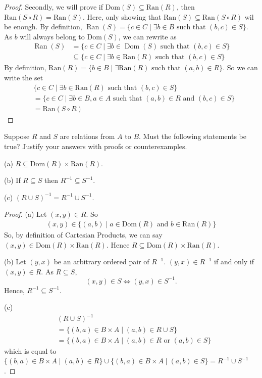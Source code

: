 \documentclass[12pt]{article}
\newenvironment{exercise}[2][Exercise]{\begin{trivlist}
\item[\hskip \labelsep {\bfseries #1}\hskip \labelsep {\bfseries #2.}]}{\end{trivlist}}
\newcommand{\ro}{\text { or }}
\newcommand{\nd}{\text{ and }}
\begin{document}
\begin{proof}
	Secondly, we will prove if $\text{Dom}(S)\subseteq \text{Ran}(R)$, then $\text{Ran}(S\circ R)=\text{Ran}(S)$. Here, only showing that $\text{Ran}(S)\subseteq \text{Ran}(S\circ R)$ wil be enough. By definition, $\operatorname{Ran}(S) = \{ c \in C \mid \exists b \in B \text{ such that } (b, c) \in S \}$. As $b$ will always belong to $\text{Dom}(S)$, we can rewrite as
\begin{align*}
	\operatorname{Ran}(S) &= \{ c \in C \mid \exists b \in \operatorname{Dom}(S) \text{ such that } (b, c) \in S \} \\
	& \subseteq \{c\in C\mid \exists b\in \text{Ran}(R) \text{ such that } (b,c)\in S\}
\end{align*}
By definition, $\text{Ran}(R)=\{b\in B\mid \exists \text{Ran}(R) \text{ such that } (a,b)\in R\}$. So we can write the set
\begin{align*}
	&\{c\in C\mid \exists b\in \text{Ran}(R) \text{ such that } (b,c)\in S\} \\
	&= \{c\in C\mid \exists b\in B, a\in A \text{ such that } (a,b)\in R \nd (b,c)\in S\} \\
	&= \text{Ran}(S\circ R)
\end{align*} 
\end{proof}

\begin{exercise}
	{10}
	Suppose \( R \) and \( S \) are relations from \( A \) to \( B \). Must the following statements be true? Justify your answers with proofs or counterexamples.

(a) \( R \subseteq \text{Dom}(R) \times \text{Ran}(R) \).

(b) If \( R \subseteq S \) then \( R^{-1} \subseteq S^{-1} \).

(c) \( (R \cup S)^{-1} = R^{-1} \cup S^{-1} \).
\end{exercise}

\begin{proof}
	(a) Let $(x,y)\in R$. So 
	\begin{align*}
		(x,y)\in \{(a,b)\mid a\in \text{Dom}(R) \nd b\in \text{Ran}(R)\}
	\end{align*}
	So, by definition of Cartesian Products, we can say $(x,y)\in \text{Dom}(R)\times \text{Ran}(R)$. Hence $R\subseteq \text{Dom}(R)\times \text{Ran}(R)$.

	(b) Let $(y,x)$ be an arbitrary ordered pair of $R^{-1}$. $(y,x)\in R^{-1}$ if and only if $(x,y)\in R$. As $R\subseteq S$,$$(x,y)\in S \iff (y,x)\in S^{-1}.$$ Hence, $R^{-1}\subseteq S^{-1}$.
	
	(c)
	\begin{align*}
		& (R\cup S)^{-1} \\
		&= \{(b,a)\in B\times A \mid (a,b)\in R\cup S\} \\
		&= \{(b,a)\in B\times A \mid (a,b)\in R \ro (a,b)\in S\}
	\end{align*}
	which is equal to $\{(b,a)\in B\times A \mid (a,b)\in R\} \cup \{(b,a)\in B\times A\mid (a,b)\in S\}=R^{-1}\cup S^{-1}$.
\end{proof}
\end{document}

